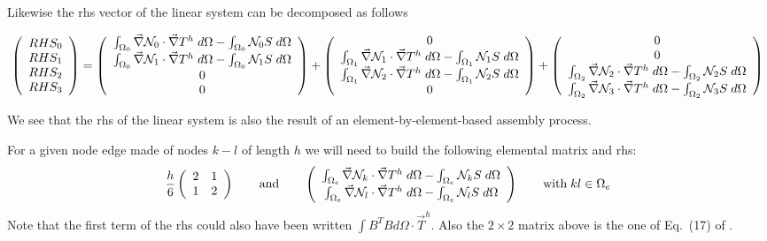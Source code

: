 Likewise the rhs vector of the linear system can be decomposed as follows
\begin{small}
\[
\left(
\begin{array}{c}
RHS_0 \\ RHS_1 \\ RHS_2 \\ RHS_3
\end{array}
\right)
=
\left(
\begin{array}{c}
\int_{\Omega_0} \vec\nabla {\mathcal{N}}_0 \cdot \vec\nabla T^h \; d\Omega - \int_{\Omega_0} {\mathcal{N}}_0 S \; d\Omega \\
\int_{\Omega_0} \vec\nabla {\mathcal{N}}_1 \cdot \vec\nabla T^h \; d\Omega - \int_{\Omega_0} {\mathcal{N}}_1 S \; d\Omega \\
0 \\ 0
\end{array}
\right)
+
\left(
\begin{array}{c}
0 \\
\int_{\Omega_1} \vec\nabla {\mathcal{N}}_1 \cdot \vec\nabla T^h \; d\Omega - \int_{\Omega_1} {\mathcal{N}}_1 S \; d\Omega \\
\int_{\Omega_1} \vec\nabla {\mathcal{N}}_2 \cdot \vec\nabla T^h \; d\Omega - \int_{\Omega_1} {\mathcal{N}}_2 S \; d\Omega \\
0
\end{array}
\right)
+
\left(
\begin{array}{c}
0 \\ 0 \\
\int_{\Omega_2} \vec\nabla {\mathcal{N}}_2 \cdot \vec\nabla T^h \; d\Omega - \int_{\Omega_2} {\mathcal{N}}_2 S \; d\Omega\\
\int_{\Omega_2} \vec\nabla {\mathcal{N}}_3 \cdot \vec\nabla T^h \; d\Omega - \int_{\Omega_2} {\mathcal{N}}_3 S \; d\Omega
\end{array}
\right)
\]

\end{small}
We see that the rhs of the linear system is also the result of an element-by-element-based assembly process.


For a given node edge made of nodes $k-l$ of length $h$ we will need to build
the following elemental matrix and rhs:
\[
\frac{h}{6}
\left(
\begin{array}{cc}
2 & 1  \\
1 & 2 
\end{array}
\right)
\qquad
\text{and}
\qquad
\left(
\begin{array}{c}
\int_{\Omega_e} \vec\nabla {\mathcal{N}}_k \cdot \vec\nabla T^h \; d\Omega - \int_{\Omega_e} {\mathcal{N}}_k S \; d\Omega \\
\int_{\Omega_e} \vec\nabla {\mathcal{N}}_l \cdot \vec\nabla T^h \; d\Omega - \int_{\Omega_e} {\mathcal{N}}_l S \; d\Omega 
\end{array}
\right)
\qquad
\text{with} \; kl \in \Omega_e
\]
Note that the first term of the rhs could also have been written $\int B^T B d\Omega \cdot \vec{T}^h$.
Also the $2\times 2$ matrix above is the one of Eq.~(17) of \textcite{cacs85}.




